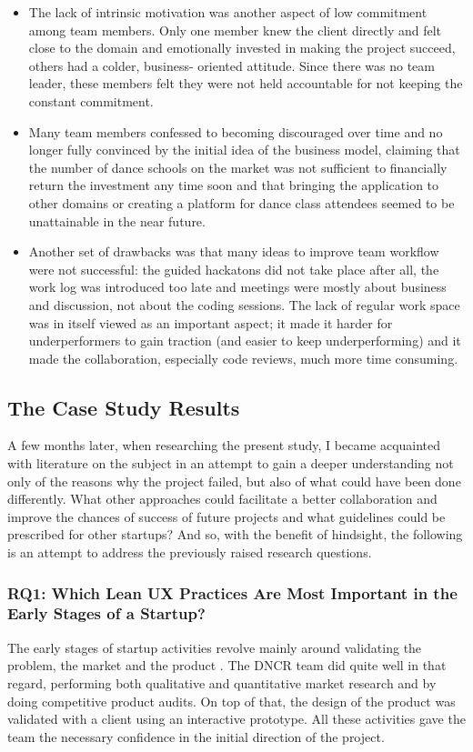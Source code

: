 \documentclass{article}
\begin{document}
\begin{itemize}
\item The lack of intrinsic motivation was another aspect of low commitment among team members. Only one member knew the client directly and felt close to the domain and emotionally invested in making the project succeed, others had a colder, business- oriented attitude. Since there was no team leader, these members felt they were not held accountable for not keeping the constant commitment.
\item Many team members confessed to becoming discouraged over time and no longer fully convinced by the initial idea of the business model, claiming that the number of dance schools on the market was not sufficient to financially return the investment any time soon and that bringing the application to other domains or creating a platform for dance class attendees seemed to be unattainable in the near future.
\item Another set of drawbacks was that many ideas to improve team workflow were not successful: the guided hackatons did not take place after all, the work log was introduced too late and meetings were mostly about business and discussion, not about the coding sessions. The lack of regular work space was in itself viewed as an important aspect; it made it harder for underperformers to gain traction (and easier to keep underperforming) and it made the collaboration, especially code reviews, much more time consuming.
\end{itemize}

\subsection{The Case Study Results}
\label{sec:research-questions}
A few months later, when researching the present study, I became acquainted with literature on the subject in an attempt to gain a deeper understanding not only of the reasons why the project failed, but also of what could have been done differently. What other approaches could facilitate a better collaboration and improve the chances of success of future projects and what guidelines could be prescribed for other startups? And so, with the benefit of hindsight, the following is an attempt to address the previously raised research questions.


\subsubsection{RQ1: Which Lean UX Practices Are Most Important in the Early Stages of a Startup?}
The early stages of startup activities revolve mainly around validating the problem, the market and the product \citep{klein2013ux}. The DNCR team did quite well in that regard, performing both qualitative and quantitative market research and by doing competitive product audits. On top of that, the design of the product was validated with a client using an interactive prototype. All these activities gave the team the necessary confidence in the initial direction of the project.
\end{document}
